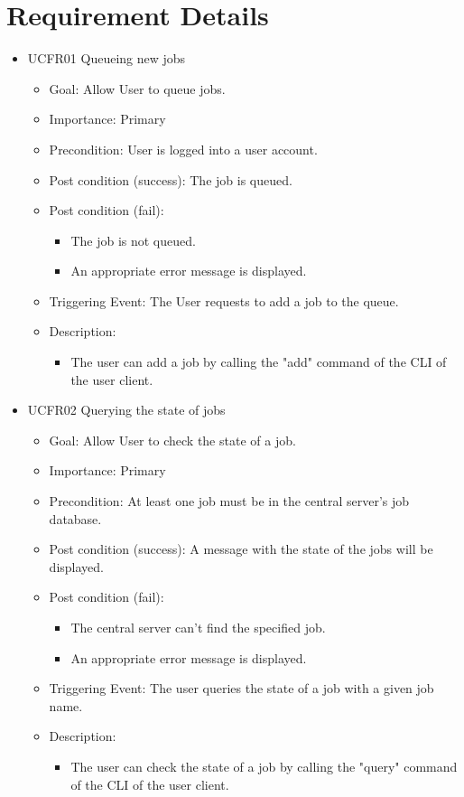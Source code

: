 \section{Requirement Details}
\begin{itemize}
  \item UCFR01 Queueing new jobs
    \begin{itemize}
      \item Goal: Allow User to queue jobs.
      \item Importance: Primary
      \item Precondition: User is logged into a user account.
      \item Post condition (success): The job is queued.
      \item Post condition (fail):
        \begin{itemize}
          \item The job is not queued.
          \item An appropriate error message is displayed.
        \end{itemize}
      \item Triggering Event: The User requests to add a job to the queue.
      \item Description:
        \begin{itemize}
          \item  The user can add a job by calling the "add" command of the CLI of the user client.
        \end{itemize}
    \end{itemize}

  \item UCFR02 Querying the state of jobs
    \begin{itemize}
      \item Goal: Allow User to check the state of a job.
      \item Importance: Primary
      \item Precondition: At least one job must be in the central server's job database.
      \item Post condition (success): A message with the state of the jobs will be displayed.
      \item Post condition (fail):
        \begin{itemize}
          \item The central server can't find the specified job.
          \item An appropriate error message is displayed.
        \end{itemize}
      \item Triggering Event: The user queries the state of a job with a given job name.
      \item Description:
        \begin{itemize}
          \item The user can check the state of a job by calling the "query" command of the CLI of the user client.
        \end{itemize}
    \end{itemize}


\end{itemize}
